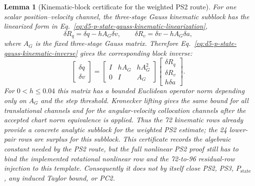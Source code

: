 \documentclass[preprint,12pt]{elsarticle}
\newtheorem{lemma}{Lemma}
\begin{document}
\begin{lemma}[Kinematic-block certificate for the weighted PS2 route]
\label{lem:d5-p-state-ps2-kinematic-block}
For one scalar position--velocity channel, the three-stage Gauss kinematic
subblock has the linearized form in
Eq.~\eqref{eq:d5-p-state-gauss-kinematic-linearization},
\begin{equation}
\label{eq:d5-p-state-gauss-kinematic-linearization}
  \delta R_q=\delta q-hA_G\delta v,\qquad
  \delta R_v=\delta v-hA_G\delta a ,
\end{equation}
where \(A_G\) is the fixed three-stage Gauss matrix.  Therefore
Eq.~\eqref{eq:d5-p-state-gauss-kinematic-inverse} gives the corresponding
block inverse:
\begin{equation}
\label{eq:d5-p-state-gauss-kinematic-inverse}
\begin{bmatrix}\delta q\\ \delta v\end{bmatrix}
=
\begin{bmatrix}
I & hA_G & hA_G^2\\
0 & I & A_G
\end{bmatrix}
\begin{bmatrix}
\delta R_q\\ \delta R_v\\ h\delta a
\end{bmatrix}.
\end{equation}
For \(0<h\le 0.04\) this matrix has a bounded Euclidean operator norm
depending only on \(A_G\) and the step threshold.  Kronecker lifting gives the
same bound for all translational channels and for the angular-velocity
collocation channels after the accepted chart norm equivalence is applied.
Thus the 72 kinematic rows already provide a concrete analytic subblock for
the weighted PS2 estimate; the 24 lower-pair rows are surplus for this
subblock.  This certificate records the algebraic constant needed by the PS2
route, but the full nonlinear PS2 proof still has to bind the implemented
rotational nonlinear row and the 72-to-96 residual-row injection to this
template.  Consequently it does not by itself close PS2, PS3,
\(P_{\mathrm{state}}\), any induced Taylor bound, or PC2.
\end{lemma}
\end{document}
